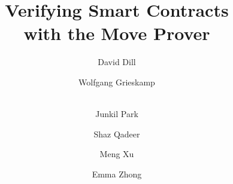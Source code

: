 \documentclass[runningheads]{llncs}
\begin{document}
\title{Verifying Smart Contracts\\ with the Move Prover}


\author{
  David Dill \and Wolfgang Grieskamp \and \\ Junkil
  Park \and Shaz Qadeer \and Meng Xu
  \and Emma Zhong
}


\maketitle










\appendix

\newpage

\newpage

\end{document}
